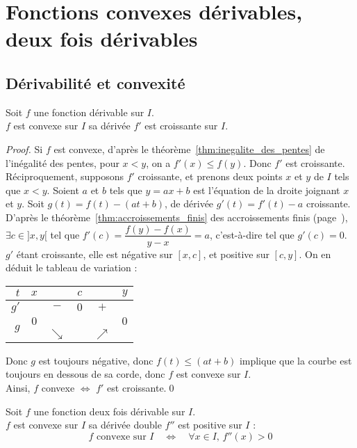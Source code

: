 \documentclass[11pt,a4paper,fleqn,pdftex]{report}
\begin{document}
\section{Fonctions convexes dérivables, deux fois dérivables} %
\label{sec:fonctions_convexes_derivables_deux_fois_derivables}
\subsection{Dérivabilité et convexité} %
\label{sub:derivabilite_et_convexite}
\begin{theorem}
     Soit $f$ une fonction dérivable sur $I$. \\
     $f$ est convexe sur $I$ \ssi{} sa dérivée $f'$ est croissante sur $I$.
\end{theorem}
\begin{proof}
     Si $f$ est convexe, d'après le théorème~\ref{thm:inegalite_des_pentes} de l'inégalité des pentes, pour $x < y$, on a $f'(x) \le f(y)$. Donc $f'$ est croissante. \\[0.7\baselineskip]
     Réciproquement, supposons $f'$ croissante, et prenons deux points $x$ et $y$ de $I$ tels que $x < y$. Soient $a$ et $b$ tels que $y = ax + b$ est l'équation de la droite joignant $x$ et $y$. Soit $g(t) = f(t) - (at + b)$, de dérivée $g'(t) = f'(t) -a$ croissante. D'après le théorème~\ref{thm:accroissements_finis} des accroissements finis (page~\pageref{thm:accroissements_finis}), $\exists c\in ]x,y[$ tel que $f'(c) = \dfrac{f(y) - f(x)}{y-x} = a$, c'est-à-dire tel que $g'(c) = 0$. $g'$ étant croissante, elle est négative sur $[x,c]$, et positive sur $[c,y]$. On en déduit le tableau de variation : 
     \begin{center}
     \begin{tabular}{r | c c c c c}
          $t$ & $x$ & & $c$ & & $y$ \\
          \hline
          $g'$& & $-$ & $0$ & $+$ & \\
          \hline
          \multirow{2}{*}{$g$}& $0$ &&&& $0$ \\
                                 &   & $\searrow$ & & $\nearrow$ & 
     \end{tabular}
     \end{center}
     Donc $g$ est toujours négative, donc $f(t) \le (at + b)$ implique que la courbe est toujours en dessous de sa corde, donc $f$ est convexe sur $I$.\\[\baselineskip]
     Ainsi, $f$ convexe $\Longleftrightarrow$ $f'$ est croissante.\qed
\end{proof}
\begin{theorem}
     Soit $f$ une fonction deux fois dérivable sur $I$. \\
     $f$ est convexe sur $I$ \ssi{} sa dérivée double $f''$ est positive sur $I$ : 
     \begin{equation}
     f\text{ convexe sur }I\quad \Longleftrightarrow \quad \forall x\in I,\, f''(x)>0
     \end{equation}
\end{theorem}
\end{document}
